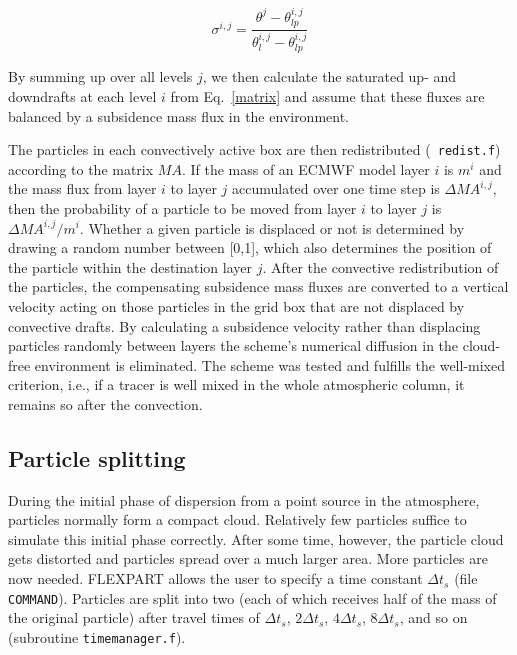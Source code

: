 \documentclass{egu}            %
\begin{document}
\begin{equation}
\sigma^{i,j}=\frac{\theta^{j}-\theta_{lp}^{i,j}}{\theta_{l}^{i,j}-\theta_{lp}^{i,j}}
\end{equation}

By summing up over all levels $j$, we then calculate the saturated up- and
downdrafts at each level $i$ from Eq.~\ref{matrix} and assume that these fluxes
are balanced by a subsidence mass flux in the environment.

The particles in each convectively active box are then redistributed ({\tt
redist.f}) according to the matrix $MA$.  If the mass of an ECMWF model layer
$i$ is $m^i$ and the mass flux from layer $i$ to layer $j$ accumulated over one
time step is $\Delta MA^{i,j}$, then the probability of a particle to be moved
from layer $i$ to layer $j$ is $\Delta MA^{i,j}/m^i$.  Whether a given particle
is displaced or not is determined by drawing a random number between [0,1],
which also determines the position of the particle within the destination layer
$j$.  After the convective redistribution of the particles, the compensating
subsidence mass fluxes are converted to a vertical velocity acting on those
particles in the grid box that are not displaced by convective drafts.  By
calculating a subsidence velocity rather than displacing particles randomly
between layers the scheme's numerical diffusion in the cloud-free environment
is eliminated.  The scheme was tested and fulfills the well-mixed criterion,
i.e., if a tracer is well mixed in the whole atmospheric column, it remains so
after the convection.

\subsection{Particle splitting}

During the initial phase of dispersion from a point source in the atmosphere,
particles normally form a compact cloud.  Relatively few particles suffice to
simulate this initial phase correctly.  After some time, however, the particle
cloud gets distorted and particles spread over a much larger area.  More
particles are now needed.  FLEXPART allows the user to specify a time constant
$\Delta t_s$ (file \verb|COMMAND|).  Particles are split into two (each of
which receives half of the mass of the original particle) after travel times of
$\Delta t_s$, $2\Delta t_s$, $4\Delta t_s$, $8\Delta t_s$, and so on
(subroutine \verb|timemanager.f|).\par
\end{document}
